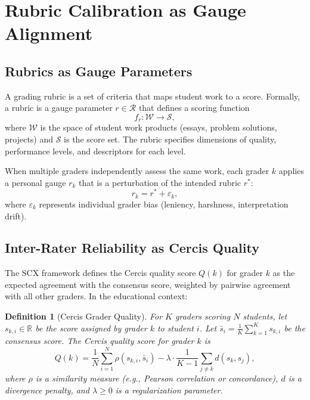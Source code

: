 \documentclass[12pt,a4paper]{article}
\newtheorem{definition}[theorem]{Definition}
\theoremstyle{remark}
\newcommand{\R}{\mathbb{R}}
\begin{document}
\section{Rubric Calibration as Gauge Alignment}

\subsection{Rubrics as Gauge Parameters}

A grading rubric is a set of criteria that maps student work to a score. Formally, a rubric is a gauge parameter $r \in \mathcal{R}$ that defines a scoring function
\begin{equation}
f_r: \mathcal{W} \to \mathcal{S},
\label{eq:rubric}
\end{equation}
where $\mathcal{W}$ is the space of student work products (essays, problem solutions, projects) and $\mathcal{S}$ is the score set. The rubric specifies dimensions of quality, performance levels, and descriptors for each level.

When multiple graders independently assess the same work, each grader $k$ applies a personal gauge $r_k$ that is a perturbation of the intended rubric $r^*$:
\begin{equation}
r_k = r^* + \varepsilon_k,
\label{eq:grader_gauge}
\end{equation}
where $\varepsilon_k$ represents individual grader bias (leniency, harshness, interpretation drift).

\subsection{Inter-Rater Reliability as Cercis Quality}

The SCX framework defines the Cercis quality score $Q(k)$ for grader $k$ as the expected agreement with the consensus score, weighted by pairwise agreement with all other graders. In the educational context:

\begin{definition}[Cercis Grader Quality]
For $K$ graders scoring $N$ students, let $s_{k,i} \in \R$ be the score assigned by grader $k$ to student $i$. Let $\bar{s}_i = \frac{1}{K} \sum_{k=1}^K s_{k,i}$ be the consensus score. The Cercis quality score for grader $k$ is
\begin{equation}
Q(k) = \frac{1}{N} \sum_{i=1}^N \rho(s_{k,i}, \bar{s}_i) - \lambda \cdot \frac{1}{K-1} \sum_{j \neq k} d(s_{k}, s_{j}),
\label{eq:cercis_quality}
\end{equation}
where $\rho$ is a similarity measure (e.g., Pearson correlation or concordance), $d$ is a divergence penalty, and $\lambda \geq 0$ is a regularization parameter.
\end{definition}
\end{document}
